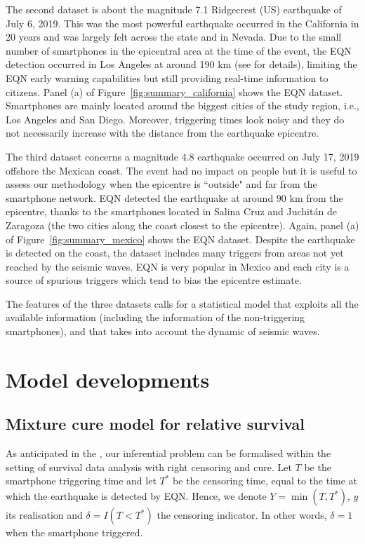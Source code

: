 \documentclass[final]{statsoc}
\begin{document}
The second dataset is about the magnitude 7.1 Ridgecrest (US) earthquake of July 6, 2019. This was the most powerful earthquake occurred in the California in 20 years and was largely felt across the state and in Nevada. Due to the small number of smartphones in the epicentral area at the time of the event, the EQN detection occurred in Los Angeles at around 190 km (see \citealt{bossu2022shaking} for details), limiting the EQN early warning capabilities but still providing real-time information to citizens.  
Panel (a) of Figure~\ref{fig:summary_california} shows the EQN dataset. Smartphones are mainly located around the biggest cities of the study region, i.e., Los Angeles and San Diego. Moreover, triggering times look noisy and they do not necessarily increase with the distance from the earthquake epicentre. 

The third dataset concerns a magnitude 4.8 earthquake occurred on July 17, 2019 offshore the Mexican coast. The event had no impact on people but it is useful to assess our methodology when the epicentre is ``outside" and far from the smartphone network. EQN detected the earthquake at around 90 km from the epicentre, thanks to the smartphones located in Salina Cruz and Juchitán de Zaragoza (the two cities along the coast closest to the epicentre). Again, panel (a) of Figure~\ref{fig:summary_mexico} shows the EQN dataset. Despite the earthquake is detected on the coast, the dataset includes many triggers from areas not yet reached by the seismic waves. EQN is very popular in Mexico and each city is a source of spurious triggers which tend to bias the epicentre estimate. 

The features of the three datasets calls for a statistical model that exploits all the available information (including the information of the non-triggering smartphones), and that takes into account the dynamic of seismic waves.

\section{Model developments}
\label{sec:model}

\subsection{Mixture cure model for relative survival}

As anticipated in the , our inferential problem can be formalised within the setting of survival data analysis with right censoring and cure. Let $T$ be the smartphone triggering time and let $T^{*}$ be the censoring time, equal to the time at which the earthquake is detected by EQN. Hence, we denote $Y =\min{(T, T^{*})}$, $y$ its realisation and $\delta = I(T<T^{*})$ the censoring indicator. In other words, $\delta = 1$ when the smartphone triggered.
\end{document}

